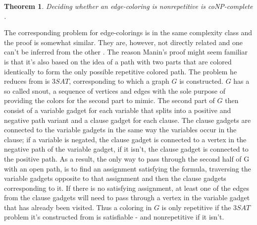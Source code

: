 \documentclass[12pt,a4paper]{article}
\newtheorem{theorem}{Theorem}
\begin{document}
\begin{theorem}
Deciding whether an edge-coloring is nonrepetitive is coNP-complete \citep{Manin2008}.
\end{theorem}
The corresponding problem for edge-colorings is in the same complexity class and the proof is somewhat similar. They are, however, not directly related and one can't be inferred from the other \citep{Marx2009}. The reason Manin's proof might seem familiar is that it's also based on the idea of a path with two parts that are colored identically to form the only possible repetitive colored path. The problem he reduces from is $3SAT$, corresponding to which a graph $G$ is constructed. $G$ has a so called snout, a sequence of vertices and edges with the sole purpose of providing the colors for the second part to mimic. The second part of $G$ then consist of a variable gadget for each variable that splits into a positive and negative path variant and a clause gadget for each clause. The clause gadgets are connected to the variable gadgets in the same way the variables occur in the clause; if a variable is negated, the clause gadget is connected to a vertex in the negative path of the variable gadget, if it isn't, the clause gadget is connected to the positive path. As a result, the only way to pass through the second half of G with an open path, is to find an assignment satisfying the formula, traversing the variable gadgets opposite to that assignment and then the clause gadgets corresponding to it. If there is no satisfying assignment, at least one of the edges from the clause gadgets will need to pass through a vertex in the variable gadget that has already been visited. Thus a coloring in $G$ is only repetitive if the $3SAT$ problem it's constructed from is satisfiable - and nonrepetitive if it isn't.
\newline
\end{document}
